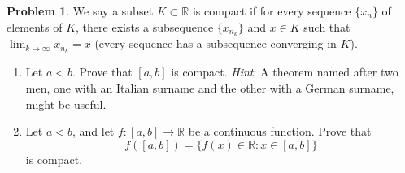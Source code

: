 \documentclass[12pt]{article}
\theoremstyle{definition}
\newtheorem{problem}{Problem}
\begin{document}
\begin{problem}
    We say a subset \(K \subset \mathbb{R}\) is compact if for every sequence \(\{x_n\}\) of elements of \(K\), there exists a subsequence \(\{x_{n_k}\}\) and \(x \in K\) such that \(\lim_{k \to \infty}x_{n_k} = x\) (every sequence has a subsequence converging in \(K\)).
    \begin{enumerate}[label=(\alph*)]
        \item Let \(a < b\). Prove that \([a, b]\) is compact. \textit{Hint}: A theorem named after two men, one with an Italian surname and the other with a German surname, might be useful.
        \item Let \(a < b\), and let \(f : [a, b] \to \mathbb{R}\) be a continuous function. Prove that
        \[
            f([a, b]) = \{f(x) \in \mathbb{R} : x \in [a, b]\}
        \]
        is compact.
    \end{enumerate}
\end{problem}
\end{document}
